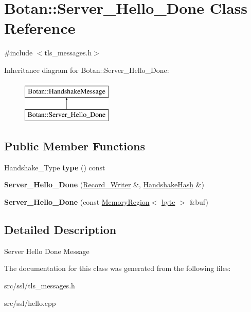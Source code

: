 \hypertarget{classBotan_1_1Server__Hello__Done}{\section{Botan\-:\-:Server\-\_\-\-Hello\-\_\-\-Done Class Reference}
\label{classBotan_1_1Server__Hello__Done}
}


{\ttfamily \#include $<$tls\-\_\-messages.\-h$>$}

Inheritance diagram for Botan\-:\-:Server\-\_\-\-Hello\-\_\-\-Done\-:\begin{figure}[H]
\begin{center}
\leavevmode
\includegraphics[height=2.000000cm]{classBotan_1_1Server__Hello__Done}
\end{center}
\end{figure}
\subsection*{Public Member Functions}
\begin{DoxyCompactItemize}
\item 
\hypertarget{classBotan_1_1Server__Hello__Done_ab72ad4bc6272484c6df6b7bdb4c6a377}{Handshake\-\_\-\-Type {\bfseries type} () const }\label{classBotan_1_1Server__Hello__Done_ab72ad4bc6272484c6df6b7bdb4c6a377}

\item 
\hypertarget{classBotan_1_1Server__Hello__Done_a8356366684e46b3c66a17fb1df8e1d82}{{\bfseries Server\-\_\-\-Hello\-\_\-\-Done} (\hyperlink{classBotan_1_1Record__Writer}{Record\-\_\-\-Writer} \&, \hyperlink{classBotan_1_1HandshakeHash}{Handshake\-Hash} \&)}\label{classBotan_1_1Server__Hello__Done_a8356366684e46b3c66a17fb1df8e1d82}

\item 
\hypertarget{classBotan_1_1Server__Hello__Done_a6c600dffe0c9ed44de410c9a6ae65194}{{\bfseries Server\-\_\-\-Hello\-\_\-\-Done} (const \hyperlink{classBotan_1_1MemoryRegion}{Memory\-Region}$<$ \hyperlink{namespaceBotan_a7d793989d801281df48c6b19616b8b84}{byte} $>$ \&buf)}\label{classBotan_1_1Server__Hello__Done_a6c600dffe0c9ed44de410c9a6ae65194}

\end{DoxyCompactItemize}


\subsection{Detailed Description}
Server Hello Done Message 

The documentation for this class was generated from the following files\-:\begin{DoxyCompactItemize}
\item 
src/ssl/tls\-\_\-messages.\-h\item 
src/ssl/hello.\-cpp\end{DoxyCompactItemize}
